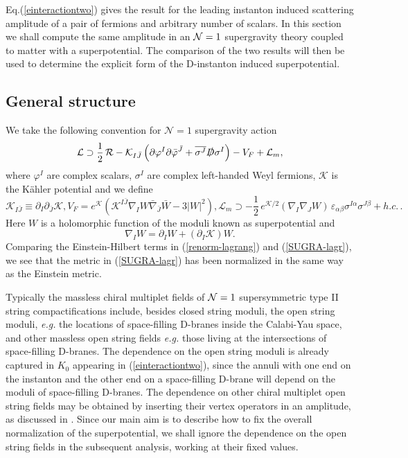 \documentclass[12pt,a4paper]{article}
\newcommand{\be}{\begin{equation}}
\newcommand{\ee}{\end{equation}}
\newcommand{\refb}[1]{(\ref{#1})}
\newcommand{\p}{\partial}
\def\({\left(}
\def\){\right)}
\newcommand{\vp}{\varphi}
\newcommand{\ve}{\varepsilon}
\newcommand{\cK}{\mathcal{K}}
\newcommand{\cL}{\mathcal{L}}
\newcommand{\NN}{{\cal N}}
\def\bW{ \bar W}
\def\bJ{\bar J}
\def\bvp{\bar \vp}
\def\bnabla{\bar \nabla}
\newcommand{\Chi}{\sigma}
\begin{document}
Eq.\refb{einteractiontwo} gives the result for the leading instanton induced
scattering amplitude of a pair of fermions and
arbitrary number of scalars. In this section we shall compute the same amplitude
in an
$\NN=1$ supergravity theory coupled to matter with a superpotential. The comparison
of the two results will then be used
to determine the explicit form of the D-instanton induced superpotential.



\subsection{General structure} \label{s4.1}

We take the following convention for $\mathcal{N}=1$ supergravity action \cite{Freedman:2012zz}
\begin{equation}
\cL\supset \frac{1}{2}\,\mathcal{R}
-\cK_{I\bJ}\left(\partial \vp^I\partial\bvp^{\bJ}+\overline{\Chi^J} \slashed{D}\Chi^{I}\right)
-V_F+\cL_m,
\label{SUGRA-lagr}
\end{equation}
where $\vp^I$ are complex scalars, $\Chi^I$ are complex left-handed Weyl fermions,
$\cK$ is the K\"ahler potential
and we define
\begin{subequations}
\begin{equation}
\cK_{I\bJ}\equiv\partial_{I}\partial_{\bJ}\cK,
\end{equation}
\begin{equation}
V_F=e^{\cK}\(\cK^{I\bJ}\nabla_I W\bnabla_{\bJ}\bW-3 |W|^2\),
\end{equation}
\be
\mathcal{L}_m\supset -\frac{1}{2}\, e^{\cK/2}(\nabla_I\nabla_J W)\,
\ve_{\alpha\beta} {\Chi}^{I\alpha}\Chi^{J\beta}+h.c.\, .
\label{fm-term}
\ee
\end{subequations}
Here $W$ is a holomorphic function of the moduli known as superpotential and
\be
\nabla_I W=\p_I W+(\p_I\cK) W.
\ee
Comparing the Einstein-Hilbert terms in \refb{renorm-lagrang} and \refb{SUGRA-lagr}, we see
that the metric in \refb{SUGRA-lagr} has been normalized in the same way as the Einstein
metric.

Typically the massless chiral multiplet fields
of $\NN=1$ supersymmetric type II string compactifications include, besides closed
string moduli, the open string moduli, {\it e.g.} the locations of space-filling D-branes inside
the Calabi-Yau space,
and other massless open string fields {\it e.g.} those living at
the intersections of space-filling D-branes. The dependence on the open string moduli is
already captured in $K_0$ appearing in \refb{einteractiontwo}, since the annuli with
one end on the instanton and the other end on a space-filling D-brane will depend on the moduli
of space-filling D-branes. The dependence on other chiral multiplet open string
fields may be obtained by
inserting their vertex operators in an amplitude, as discussed
in \cite{Akerblom:2007uc,Cvetic:2007ku,Blumenhagen:2009qh}. Since our main aim is
to describe how to fix the overall normalization of the superpotential, we shall ignore the
dependence on the open string fields in the subsequent analysis, working at their fixed values.
\end{document}
